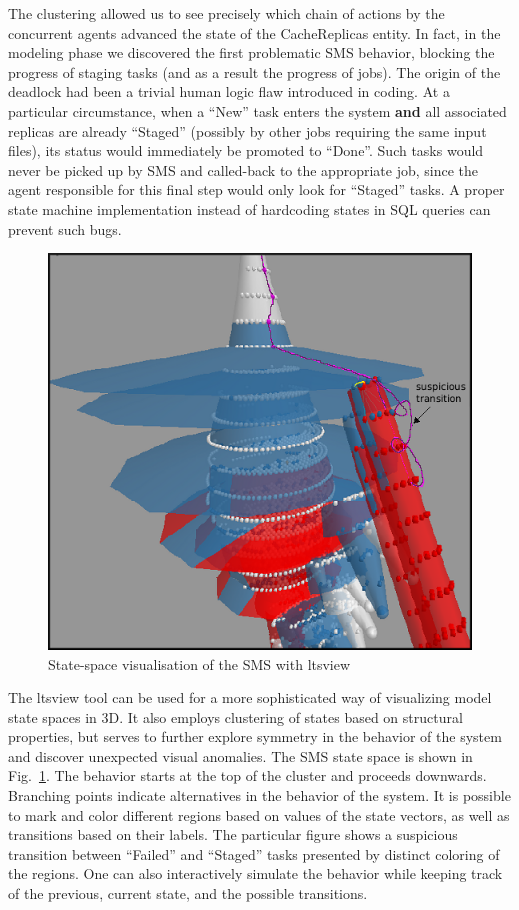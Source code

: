 \documentclass[sort&compress,preprint,3p]{elsarticle}
\begin{document}
The clustering
allowed us to see precisely which chain of actions by the concurrent agents
advanced the state of the CacheReplicas entity. In fact, in the modeling phase we discovered the first problematic
SMS behavior, blocking the progress of staging
tasks (and as a result the progress of jobs). The origin of the deadlock had been a
trivial human logic flaw introduced in coding. At a particular circumstance,
when a ``New'' task enters the system \textbf{and} all associated replicas
are already ``Staged'' (possibly by other jobs requiring the same input files),
its status would immediately be promoted to ``Done''.
Such tasks would never be picked up by SMS and called-back to the appropriate job, 
since the agent responsible for this final step would only look for ``Staged'' tasks.
A proper state machine implementation
instead of hardcoding states in SQL queries can prevent such bugs.
\begin{figure}[bp!]
\vspace{-10 pt}
\includegraphics[width=0.57\linewidth,keepaspectratio=true]{./graphics/Figure8.png}
\centering
\caption{State-space visualisation of the SMS with ltsview}
\label{fig:LTSviewVisualisation}
\end{figure}%

The ltsview tool can be used for a more sophisticated way of visualizing model state spaces in 3D.
It also employs clustering of states based on structural properties, but serves to further 
explore symmetry in the behavior of the system and discover unexpected visual anomalies.
The SMS state space is shown in Fig.~\ref{fig:LTSviewVisualisation}. 
The behavior 
starts at the top of the cluster and proceeds downwards. Branching points indicate 
alternatives in the behavior of the system. It is possible to mark and color different
regions based on values of the state vectors, as well as transitions based on their labels.
The particular figure shows a suspicious transition between ``Failed'' and ``Staged'' tasks presented
by distinct coloring of the regions. One can also interactively simulate the behavior while keeping 
track of the previous, current state, and the possible transitions.
\end{document}
